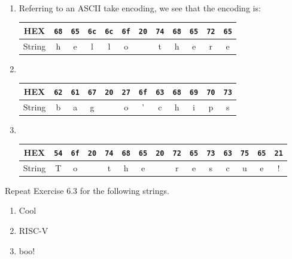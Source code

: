\documentclass[12pt]{article}
\newenvironment{ex}[2][Exercise]{\begin{trivlist}
		\item[\hskip \labelsep {\bfseries #1}\hskip \labelsep {\bfseries #2.}]}{\end{trivlist}}
\newenvironment{sol}[1][Solution]{\begin{trivlist}
		\item[\hskip \labelsep {\bfseries #1:}]}{\end{trivlist}}
\begin{document}
\begin{sol}
	\
	\begin{enumerate}[label=(\alph*)]
		\item Referring to an ASCII take encoding, we see that the encoding is:
		\begin{center}
			\begin{tabular}{c|ccccccccccc}
				HEX & \texttt{68} &\texttt{65} & \texttt{6c} &\texttt{6c} &\texttt{6f} & \texttt{20}&
				\texttt{74} & \texttt{68} & \texttt{65} & \texttt{72} & \texttt{65}\\
				\hline
				String & h & e & l &l & o & {} & t & h & e & r & e
			\end{tabular}
		\end{center}
		\item 
		\
		\begin{center}
			\begin{tabular}{c|ccccccccccc}
				HEX & \texttt{62} & \texttt{61} & \texttt{67} & \texttt{20} & \texttt{27} & \texttt{6f}
				& \texttt{63} & \texttt{68} & \texttt{69} & \texttt{70} & \texttt{73}\\
				\hline
				String & b & a & g & {} & o & ' & c & h & i & p & s
			\end{tabular}
		\end{center}
		\item 
		\
		\begin{center}
			\begin{tabular}{c|cccccccccccccc}
				HEX & \texttt{54} & \texttt{6f} & \texttt{20} & \texttt{74} & \texttt{68}& \texttt{65}
				& \texttt{20} & \texttt{72} & \texttt{65} & \texttt{73} & \texttt{63} & \texttt{75}
				& \texttt{65} & \texttt{21}\\
				\hline
				String & T & o & {} & t & h & e & {} & r & e & s & c & u & e & !
			\end{tabular}
		\end{center}
	\end{enumerate}
\end{sol}

\begin{ex}{6.4}
	Repeat Exercise 6.3 for the following strings.
	\begin{enumerate}
		\item Cool
		\item RISC-V
		\item boo!
	\end{enumerate}
\end{ex}
\end{document}
